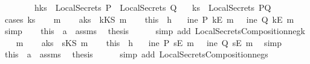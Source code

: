 \begin{isabellebody}
\ \ \ \ \ \ \ \ h{}{\isacharcolon}{\isachardoublequoteopen}ks\ {\isasymnotin}\ {\isacharparenleft}{\isacharparenleft}LocalSecrets\ P{\isacharparenright}\ {\isasymunion}\ {\isacharparenleft}LocalSecrets\ Q{\isacharparenright}{\isacharparenright}{\isachardoublequoteclose}\isanewline
{}\ \ \ {\isachardoublequoteopen}ks\ {\isasymnotin}\ {\isacharparenleft}LocalSecrets\ PQ{\isacharparenright}{\isachardoublequoteclose}\isanewline
%
\isadelimproof
%
\endisadelimproof
%
\isatagproof
{}\isamarkupfalse%
\ {\isacharparenleft}cases\ {\isachardoublequoteopen}ks{\isachardoublequoteclose}{\isacharparenright}\isanewline
\ \ \isamarkupfalse%
\ m\isanewline
\ \ \isamarkupfalse%
\ a{}{\isacharcolon}{\isachardoublequoteopen}ks\ {\isacharequal}\ kKS\ m{\isachardoublequoteclose}\isanewline
\ \ \isamarkupfalse%
\ this\ \ h{}\ \isamarkupfalse%
\ {\isachardoublequoteopen}{\isasymnot}\ ine\ P\ {\isacharparenleft}kE\ m{\isacharparenright}\ {\isasymand}\ {\isasymnot}\ ine\ Q\ {\isacharparenleft}kE\ m{\isacharparenright}{\isachardoublequoteclose}\ \isamarkupfalse%
\ simp\isanewline
\ \ \isamarkupfalse%
\ this\ \ a{}\ \ assms\ \isamarkupfalse%
\ {\isacharquery}thesis\isanewline
\ \ \ \ \isamarkupfalse%
\ {\isacharparenleft}simp\ add{\isacharcolon}\ LocalSecretsComposition{\isacharunderscore}neg{\isacharunderscore}k{\isacharparenright}\isanewline
{}\isamarkupfalse%
\isanewline
\ \ \isamarkupfalse%
\ m\isanewline
\ \ \isamarkupfalse%
\ a{}{\isacharcolon}{\isachardoublequoteopen}ks\ {\isacharequal}\ sKS\ m{\isachardoublequoteclose}\isanewline
\ \ \isamarkupfalse%
\ this\ \ h{}\ \isamarkupfalse%
\ {\isachardoublequoteopen}{\isasymnot}\ ine\ P\ {\isacharparenleft}sE\ m{\isacharparenright}\ {\isasymand}\ {\isasymnot}\ ine\ Q\ {\isacharparenleft}sE\ m{\isacharparenright}{\isachardoublequoteclose}\ \isamarkupfalse%
\ simp\isanewline
\ \ \isamarkupfalse%
\ this\ \ a{}\ \ assms\ \isamarkupfalse%
\ {\isacharquery}thesis\isanewline
\ \ \ \ \isamarkupfalse%
\ {\isacharparenleft}simp\ add{\isacharcolon}\ LocalSecretsComposition{\isacharunderscore}neg{\isacharunderscore}s{\isacharparenright}\isanewline

\end{isabellebody}
